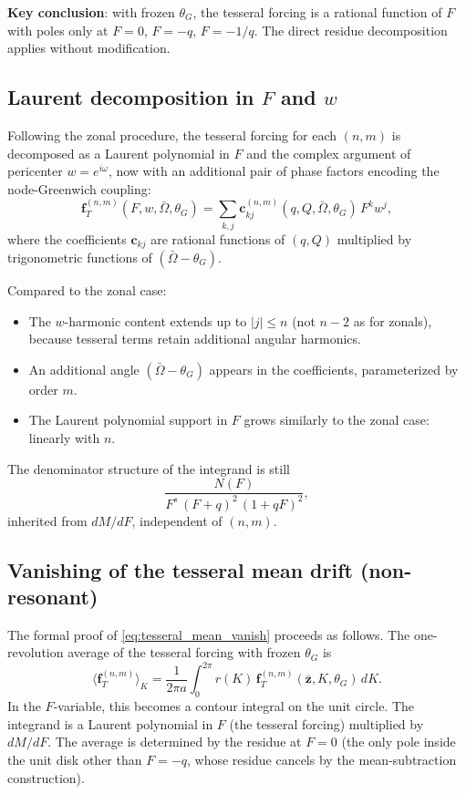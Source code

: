 \documentclass[11pt]{article}
\newcommand{\mean}[1]{\langle #1 \rangle}
\begin{document}
\textbf{Key conclusion}: with frozen $\theta_G$, the tesseral forcing is a
rational function of $F$ with poles only at $F = 0$, $F = -q$, $F = -1/q$.
The direct residue decomposition applies without modification.

\subsection{Laurent decomposition in \texorpdfstring{$F$}{F} and
\texorpdfstring{$w$}{w}}

Following the zonal procedure, the tesseral forcing for each $(n,m)$ is
decomposed as a Laurent polynomial in $F$ and the complex argument of
pericenter $w = e^{i\omega}$, now with an additional pair of phase factors
encoding the node-Greenwich coupling:
\begin{equation}
\bm f_T^{(n,m)}(F, w, \bar\Omega, \theta_G)
= \sum_{k,j} \bm c_{kj}^{(n,m)}(q, Q, \bar\Omega, \theta_G)\,
F^k w^j,
\label{eq:tesseral_laurent}
\end{equation}
where the coefficients $\bm c_{kj}$ are rational functions of $(q, Q)$
multiplied by trigonometric functions of $(\bar\Omega - \theta_G)$.

Compared to the zonal case:
\begin{itemize}
\item The $w$-harmonic content extends up to $|j| \le n$ (not $n-2$ as
for zonals), because tesseral terms retain additional angular harmonics.
\item An additional angle $(\bar\Omega - \theta_G)$ appears in the
coefficients, parameterized by order $m$.
\item The Laurent polynomial support in $F$ grows similarly to the zonal
case: linearly with $n$.
\end{itemize}

The denominator structure of the integrand is still
\begin{equation}
\frac{N(F)}{F^s\,(F+q)^2\,(1+qF)^2},
\end{equation}
inherited from $dM/dF$, independent of $(n,m)$.

\subsection{Vanishing of the tesseral mean drift (non-resonant)}

The formal proof of \eqref{eq:tesseral_mean_vanish} proceeds as follows.
The one-revolution average of the tesseral forcing with frozen $\theta_G$ is
\begin{equation}
\mean{\bm f_T^{(n,m)}}_K
= \frac{1}{2\pi a}
\int_0^{2\pi} r(K)\,\bm f_T^{(n,m)}(\bar{\bm z}, K, \theta_G)\,dK.
\end{equation}
In the $F$-variable, this becomes a contour integral on the unit circle.
The integrand is a Laurent polynomial in $F$ (the tesseral forcing)
multiplied by $dM/dF$. The average is determined by the residue at $F = 0$
(the only pole inside the unit disk other than $F = -q$, whose residue
cancels by the mean-subtraction construction).
\end{document}
